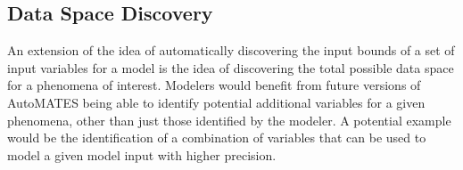 \subsection{Data Space Discovery\label{sec:auto_dsd}}
An extension of the idea of automatically discovering the input bounds of a set of input variables for a model is the idea of discovering the total possible data space for a phenomena of interest. Modelers would benefit from future versions of AutoMATES being able to identify potential additional variables for a given phenomena, other than just those identified by the modeler. A potential example would be the identification of a combination of variables that can be used to model a given model input with higher precision.
